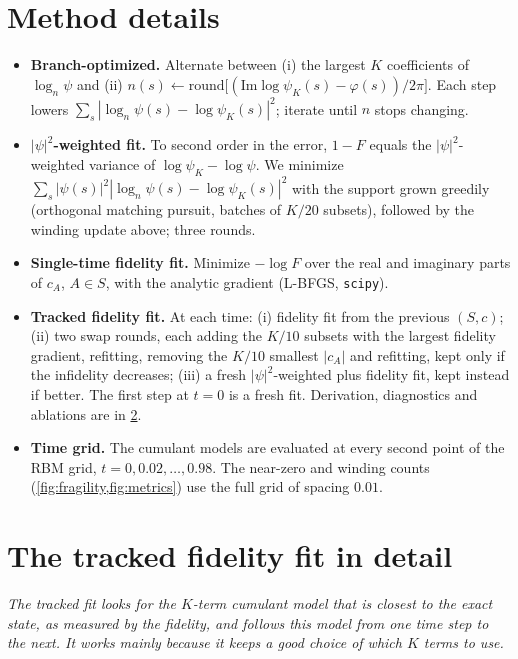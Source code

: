 \documentclass[11pt,a4paper]{article}
\begin{document}
\section{Method details}\label{app:methods}
\begin{itemize}
  \item \textbf{Branch-optimized.} Alternate between (i) the largest $K$ coefficients of $\log_n\psi$ and (ii) $n(s)\leftarrow\mathrm{round}\bigl[(\mathrm{Im}\log\psi_K(s)-\varphi(s))/2\pi\bigr]$. Each step lowers $\sum_s|\log_n\psi(s)-\log\psi_K(s)|^2$; iterate until $n$ stops changing.
  \item \textbf{$|\psi|^2$-weighted fit.} To second order in the error, $1-F$ equals the $|\psi|^2$-weighted variance of $\log\psi_K-\log\psi$. We minimize $\sum_s|\psi(s)|^2|\log_n\psi(s)-\log\psi_K(s)|^2$ with the support grown greedily (orthogonal matching pursuit, batches of $K/20$ subsets), followed by the winding update above; three rounds.
  \item \textbf{Single-time fidelity fit.} Minimize $-\log F$ over the real and imaginary parts of $c_A$, $A\in S$, with the analytic gradient (L-BFGS, \texttt{scipy}).
  \item \textbf{Tracked fidelity fit.} At each time: (i) fidelity fit from the previous $(S,c)$; (ii) two swap rounds, each adding the $K/10$ subsets with the largest fidelity gradient, refitting, removing the $K/10$ smallest $|c_A|$ and refitting, kept only if the infidelity decreases; (iii) a fresh $|\psi|^2$-weighted plus fidelity fit, kept instead if better. The first step at $t=0$ is a fresh fit. Derivation, diagnostics and ablations are in \cref{app:tracked}.
  \item \textbf{Time grid.} The cumulant models are evaluated at every second point of the RBM grid, $t=0,0.02,\dots,0.98$. The near-zero and winding counts (\cref{fig:fragility,fig:metrics}) use the full grid of spacing $0.01$.
\end{itemize}

\FloatBarrier
\section{The tracked fidelity fit in detail}\label{app:tracked}
\emph{The tracked fit looks for the $K$-term cumulant model that is closest to the exact state, as measured by the fidelity, and follows this model from one time step to the next. It works mainly because it keeps a good choice of which $K$ terms to use.}
\end{document}
